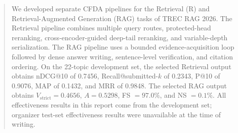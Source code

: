 \begin{abstract}
We developed separate CFDA pipelines for the Retrieval (R) and Retrieval-Augmented Generation (RAG) tasks of TREC RAG 2026. The Retrieval pipeline combines multiple query routes, protected-head reranking, cross-encoder-guided deep-tail reranking, and variable-depth serialization. The RAG pipeline uses a bounded evidence-acquisition loop followed by dense answer writing, sentence-level verification, and citation ordering. On the 22-topic development set, the selected Retrieval output obtains nDCG@10 of 0.7456, Recall@submitted-$k$ of 0.2343, P@10 of 0.9076, MAP of 0.1432, and MRR of 0.9848. The selected RAG output obtains $V_{\mathrm{strict}}=0.4656$, $A=0.5298$, FS $=97.0\%$, and NS $=0.1\%$. All effectiveness results in this report come from the development set; organizer test-set effectiveness results were unavailable at the time of writing.
\end{abstract}
